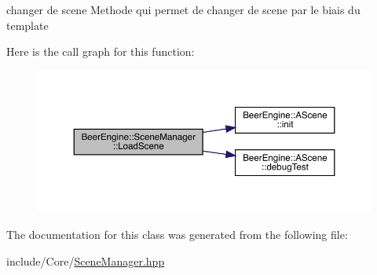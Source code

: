 changer de scene Methode qui permet de changer de scene par le biais du template 

Here is the call graph for this function\+:
\nopagebreak
\begin{figure}[H]
\begin{center}
\leavevmode
\includegraphics[width=350pt]{class_beer_engine_1_1_scene_manager_a9414ed3c9d4a170e198afe83d15db360_cgraph}
\end{center}
\end{figure}


The documentation for this class was generated from the following file\+:\begin{DoxyCompactItemize}
\item 
include/\+Core/\mbox{\hyperlink{_scene_manager_8hpp}{Scene\+Manager.\+hpp}}\end{DoxyCompactItemize}

